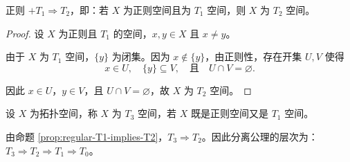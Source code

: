 \documentclass[lang=cn,a4paper,newtx,figureplace=section,tableplace=section]{elegantbook}
\begin{document}
\begin{proposition}\label{prop:regular-T1-implies-T2}
正则 $+ T_1 \Rightarrow T_2$，即：若 $X$ 为正则空间且为 $T_1$ 空间，则 $X$ 为 $T_2$ 空间。
\end{proposition}
\begin{proof}
设 $X$ 为正则且 $T_1$ 的空间，$x, y \in X$ 且 $x \neq y$。

由于 $X$ 为 $T_1$ 空间，$\{y\}$ 为闭集。因为 $x \notin \{y\}$，由正则性，存在开集 $U, V$ 使得
\begin{equation}
x \in U, \quad \{y\} \subseteq V, \quad \text{且} \quad U \cap V = \varnothing.
\end{equation}

因此 $x \in U$，$y \in V$，且 $U \cap V = \varnothing$，故 $X$ 为 $T_2$ 空间。
\end{proof}

\begin{definition}[$T_3$ 空间]\label{def:T3-space}
设 $X$ 为拓扑空间，称 $X$ 为 $T_3$ 空间，若 $X$ 既是正则空间又是 $T_1$ 空间。
\end{definition}

\begin{remark}
由命题 \ref{prop:regular-T1-implies-T2}，$T_3 \Rightarrow T_2$。因此分离公理的层次为：$T_3 \Rightarrow T_2 \Rightarrow T_1 \Rightarrow T_0$。
\end{remark}
\end{document}
